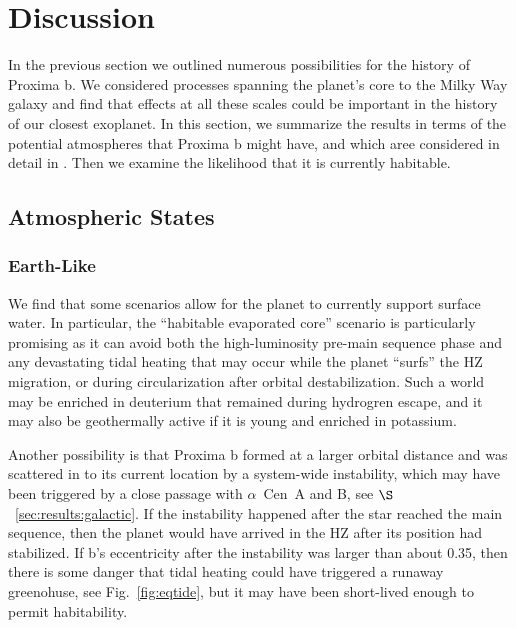\documentclass[preprint,12pt]{aastex}
\def\acen{{$\alpha$~Cen}}
\begin{document}

\section{Discussion\label{sec:disc}}

In the previous section we outlined numerous possibilities for the history of 
Proxima b. We considered processes spanning the planet's core to the Milky Way 
galaxy and find that effects at all these scales could be important in the history 
of our closest exoplanet. In this section, we summarize the results in terms of 
the potential atmospheres that Proxima b might have, and which aree considered 
in detail in \citep{Meadows16}. Then we examine the likelihood that it is currently 
habitable.

\subsection{Atmospheric States}
\label{sec:results:atmstates}

\subsubsection{Earth-Like}
\label{sec:results:atmstates:earthlike}

We find that some scenarios allow for the planet to currently support
surface water. In particular, the ``habitable evaporated core'' scenario
\citep{Luger15} is particularly promising as it can avoid both the
high-luminosity pre-main sequence phase and any devastating tidal
heating that may occur while the planet ``surfs'' the HZ migration, or
during circularization after orbital destabilization. Such a world may
be enriched in deuterium that remained during hydrogren escape, and it
may also be geothermally active if it is young and enriched in
potassium.

Another possibility is that Proxima b formed at a larger orbital
distance and was scattered in to its current location by a system-wide
instability, which may have been triggered by a close passage with
\acen~A and B, see $\S$~\ref{sec:results:galactic}. If the instability
happened after the star reached the main sequence, then the planet
would have arrived in the HZ after its position had stabilized. If b's
eccentricity after the instability was larger than about 0.35, then
there is some danger that tidal heating could have triggered a runaway
greenohuse, see Fig.~\ref{fig:eqtide}, but it may have been
short-lived enough to permit habitability.
\end{document}
